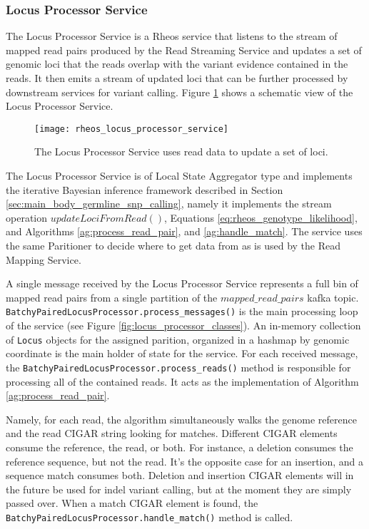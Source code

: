 \subsubsection{Locus Processor Service}

The Locus Processor Service is a Rheos service that listens to the stream of mapped read pairs produced by the Read Streaming Service and updates a set of genomic loci that the reads overlap with the variant evidence contained in the reads. It then emits a stream of updated loci that can be further processed by downstream services for variant calling. Figure \ref{fig:rheos_locus_processor_service} shows a schematic view of the Locus Processor Service.

\begin{figure}[h!]
    \texttt{[image: rheos\_locus\_processor\_service]}
    \centering
    \caption {The Locus Processor Service uses read data to update a set of loci.}
    \label{fig:rheos_locus_processor_service}
\end{figure}

The Locus Processor Service is of Local State Aggregator type and implements the iterative Bayesian inference framework described in Section \ref{sec:main_body_germline_snp_calling}, namely it implements the stream operation $updateLociFromRead()$, Equations \ref{eq:rheos_genotype_likelihood}, and Algorithms \ref{ag:process_read_pair}, and \ref{ag:handle_match}. The service uses the same Paritioner to decide where to get data from as is used by the Read Mapping Service.

A single message received by the Locus Processor Service represents a full bin of mapped read pairs from a single partition of the $mapped\_read\_pairs$ kafka topic. \texttt{BatchyPairedLocusProcessor.process_messages()} is the main processing loop of the service (see Figure \ref{fig:locus_processor_classes}). An in-memory collection of \texttt{Locus} objects for the assigned parition, organized in a hashmap by genomic coordinate is the main holder of state for the service. For each received message, the \texttt{BatchyPairedLocusProcessor.process_reads()} method is responsible for processing all of the contained reads. It acts as the implementation of Algorithm \ref{ag:process_read_pair}.

Namely, for each read, the algorithm simultaneously walks the genome reference and the read CIGAR string looking for matches. Different CIGAR elements consume the reference, the read, or both. For instance, a deletion consumes the reference sequence, but not the read. It's the opposite case for an insertion, and a sequence match consumes both. Deletion and insertion CIGAR elements will in the future be used for indel variant calling, but at the moment they are simply passed over. When a match CIGAR element is found, the \texttt{BatchyPairedLocusProcessor.handle_match()} method is called.

